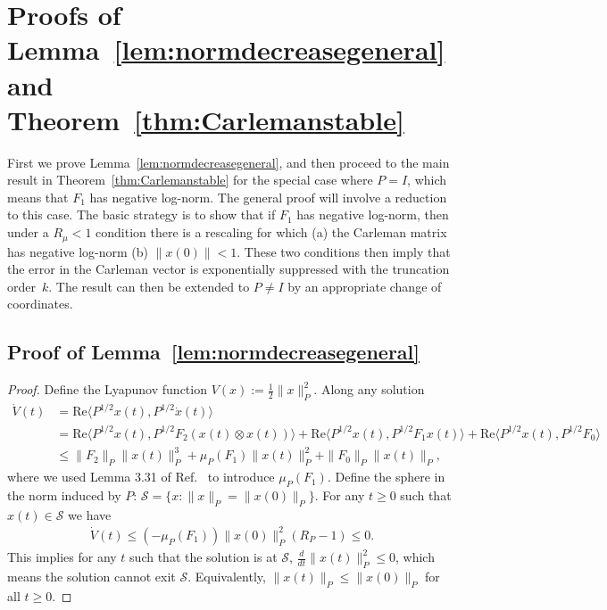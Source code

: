 \documentclass[superscriptaddress,onecolumn,nofootinbib,longbibliography,a4paper,accepted=2026-09-29]{quantumarticle}
\theoremstyle{plain}
\theoremstyle{definition}
\numberwithin{thm}{section}
\numberwithin{assumption}{section}
\numberwithin{lemma}{section}
\numberwithin{prop}{section}
\numberwithin{cor}{section}
\numberwithin{definition}{section}
\numberwithin{rmk}{section}
\numberwithin{equation}{section}
\begin{document}

\section{Proofs of Lemma~\ref{lem:normdecreasegeneral} and Theorem~\ref{thm:Carlemanstable}}
\label{sec:proofCarlemanstable}

First we prove Lemma~\ref{lem:normdecreasegeneral}, and then proceed to the main result in Theorem~\ref{thm:Carlemanstable} for the special case where $P=I$, which means that $F_1$ has negative log-norm. The general proof will involve a reduction to this case. The basic strategy is to show that if $F_1$ has negative log-norm, then under a $R_\mu<1$ condition there is a rescaling for which (a) the Carleman matrix has negative log-norm (b) $\|x(0)\|<1$. These two conditions then imply that the error in the Carleman vector is exponentially suppressed with the truncation order~$k$. The result can then be extended to $P \neq I$ by an appropriate change of coordinates.


\subsection{Proof of Lemma~\ref{lem:normdecreasegeneral}}

\begin{proof}
 
Define the Lyapunov function $V(x):=\tfrac12\|x\|_P^2$. Along any solution
\begin{align*}
\dot V(t)& =\mathrm{Re} \langle P^{1/2} x(t), P^{1/2} \dot x(t)\rangle
            \\ & = \mathrm{Re} \langle P^{1/2} x(t), P^{1/2} F_2(x(t)\otimes x(t))\rangle
           + \mathrm{Re} \langle P^{1/2} x(t), P^{1/2} F_1 x(t)\rangle
           + \mathrm{Re} \langle P^{1/2} x(t), P^{1/2} F_0\rangle \\
           & \leq \|F_2\|_P \| x(t)\|_P^3 + \mu_P(F_1) \| x(t)\|_P^2 + \|F_0\|_P \| x(t)\|_P,
\end{align*}
where we used Lemma 3.31 of Ref.~\cite{plischke2005transient} to introduce $\mu_P(F_1)$. Define the  sphere in the norm induced by $P$: $\mathcal{S} = \{ x: \|x\|_P = \|x(0)\|_P\}$. For any $t\geq 0$ such that $x(t) \in \mathcal{S}$ we have
\begin{align}
    \dot{V}(t) \leq (-\mu_P(F_1)) \|x(0)\|^2_P  (R_P -1) \leq 0. 
\end{align}
This implies for any $t$ such that the solution is at $\mathcal{S}$, $\frac{d}{dt} \|x(t)\|_P^2 \leq 0$, which means the solution cannot exit $\mathcal{S}$. Equivalently, $\|x(t)\|_P \leq \|x(0)\|_P$ for all $t \geq 0$. 
     
\end{proof}
\end{document}
